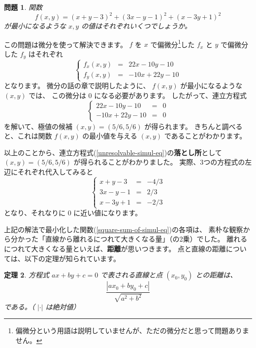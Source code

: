 \documentclass[uplatex,dvipdfmx]{jsarticle}
\newtheorem{thm}{定理}
\newtheorem{prob}[thm]{問題}
\begin{document}
  \begin{prob}
    関数
    \[
      f(x,y) = (x+y-3)^2 + (3x-y-1)^2 + (x-3y+1)^2
    \]
    が最小になるような $x,y$ の値はそれぞれいくつでしょうか。
  \end{prob}

  この問題は微分を使って解決できます。
  $f$ を $x$ で偏微分\footnote{
    偏微分という用語は説明していませんが、ただの微分だと思って問題ありません。
  }した $f_x$ と $y$ で偏微分した $f_y$ はそれぞれ
  \[
    \left\{
    \begin{array}{lll}
      f_x(x,y) &=& 22x -10y -10 \\
      f_y(x,y) &=& -10x +22y -10
    \end{array}
    \right.
  \]
  となります。
  微分の話の章で説明したように、 $f(x,y)$ が最小になるような $(x,y)$ では、
  この微分は $0$ になる必要があります。
  したがって、連立方程式
  \[
    \left\{
    \begin{array}{lll}
      22x -10y -10 &=& 0 \\
      -10x +22y -10 &=& 0
    \end{array}
    \right.
  \]
  を解いて、極値の候補 $(x,y) = (5/6, 5/6)$ が得られます。
  きちんと調べると、これは関数 $f(x,y)$ の最小値を与える $(x,y)$ であることがわかります。

  以上のことから、連立方程式(\ref{unresolvable-simul-eq})の\textbf{落とし所}として
  $(x,y) = (5/6, 5/6)$ が得られることがわかりました。
  実際、3つの方程式の左辺にそれぞれ代入してみると
  \[
    \left\{
    \begin{array}{lll}
      x + y - 3 &=& -4/3 \\
      3x - y - 1 &=& 2/3 \\
      x - 3y + 1 &=& -2/3
    \end{array}
    \right.
  \]
  となり、それなりに $0$ に近い値になります。

  上記の解法で最小化した関数(\ref{square-sum-of-simul-eq})の各項は、
  素朴な観察から分かった「直線から離れるにつれて大きくなる量」（の2乗）でした。
  離れるにつれて大きくなる量といえば、\textbf{距離}が思いつきます。
  点と直線の距離については、以下の定理が知られています。

  \begin{thm}
    方程式 $ax +by +c = 0$ で表される直線と点 $(x_0, y_0)$ との距離は、
    \[
      \frac{|ax_0 +by_0 +c|}{\sqrt{a^2 +b^2}}
    \]
    である。（ $|\cdot|$ は絶対値）
  \end{thm}
\end{document}
